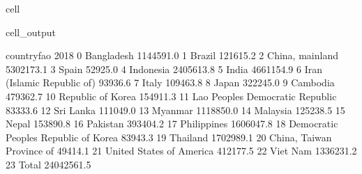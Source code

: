 \documentclass[letterpaper,10pt,english]{jupyterBook}
\begin{document}
\begin{sphinxuseclass}{cell}
\begin{sphinxVerbatimOutput}
\begin{sphinxuseclass}{cell_output}
\begin{sphinxVerbatim}[commandchars=\\\{\}]
                              country\PYGZus{}fao        2018  \PYGZbs{}
0                              Bangladesh   1144591.0   
1                                  Brazil    121615.2   
2                         China, mainland   5302173.1   
3                                   Spain     52925.0   
4                               Indonesia   2405613.8   
5                                   India   4661154.9   
6              Iran (Islamic Republic of)     93936.6   
7                                   Italy    109463.8   
8                                   Japan    322245.0   
9                                Cambodia    479362.7   
10                      Republic of Korea    154911.3   
11       Lao People\PYGZsq{}s Democratic Republic     83333.6   
12                              Sri Lanka    111049.0   
13                                Myanmar   1118850.0   
14                               Malaysia    125238.5   
15                                  Nepal    153890.8   
16                               Pakistan    393404.2   
17                            Philippines   1606047.8   
18  Democratic People\PYGZsq{}s Republic of Korea     83943.3   
19                               Thailand   1702989.1   
20              China, Taiwan Province of     49414.1   
21               United States of America    412177.5   
22                               Viet Nam   1336231.2   
23                                  Total  24042561.5   


\end{sphinxVerbatim}
\end{sphinxuseclass}
\end{sphinxVerbatimOutput}
\end{sphinxuseclass}
\end{document}
